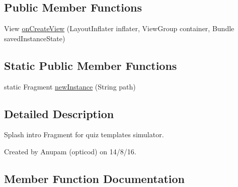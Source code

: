 \subsection*{Public Member Functions}
\begin{DoxyCompactItemize}
\item 
View \hyperlink{classorg_1_1buildmlearn_1_1toolkit_1_1quiztemplate_1_1fragment_1_1SplashFragment_a082b8a94350defa2ec017b5415edb647}{on\+Create\+View} (Layout\+Inflater inflater, View\+Group container, Bundle saved\+Instance\+State)
\end{DoxyCompactItemize}
\subsection*{Static Public Member Functions}
\begin{DoxyCompactItemize}
\item 
static Fragment \hyperlink{classorg_1_1buildmlearn_1_1toolkit_1_1quiztemplate_1_1fragment_1_1SplashFragment_a45460215a077767b7d501cf0086cf3ea}{new\+Instance} (String path)
\end{DoxyCompactItemize}


\subsection{Detailed Description}
Splash intro Fragment for quiz template\textquotesingle{}s simulator. 

Created by Anupam (opticod) on 14/8/16. 

\subsection{Member Function Documentation}
